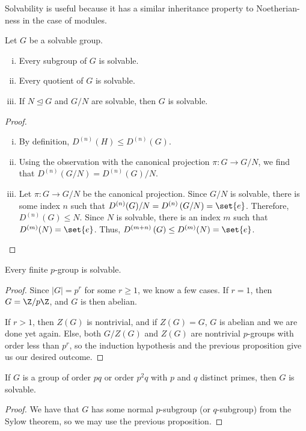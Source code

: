 \documentclass[10pt]{mypackage}
\begin{document}
Solvability is useful because it has a similar inheritance property to Noetherian-ness in the case of modules.
\begin{proposition}
  Let $G$ be a solvable group.
  \begin{enumerate}[(i)]
    \item Every subgroup of $G$ is solvable.
    \item Every quotient of $G$ is solvable.
    \item If $N\trianglelefteq G$ and $G/N$ are solvable, then $G$ is solvable.
  \end{enumerate}
\end{proposition}
\begin{proof}\hfill
  \begin{enumerate}[(i)]
    \item By definition, $D^{(n)}(H)\leq D^{(n)}(G)$.
    \item Using the observation with the canonical projection $\pi\colon G\rightarrow G/N$, we find that $D^{(n)}(G/N) = D^{(n)}(G)/N$.
    \item Let $\pi\colon G\rightarrow G/N$ be the canonical projection. Since $G/N$ is solvable, there is some index $n$ such that $D^{(n)}(G)/N = D^{(n)}\left( G/N \right) = \set{e}$. Therefore, $D^{(n)}(G)\leq N$. Since $N$ is solvable, there is an index $m$ such that $D^{(m)}(N) = \set{e}$. Thus, $D^{(m+n)}\left( G \right) \leq D^{(m)}(N) = \set{e}$.
  \end{enumerate}
\end{proof}
\begin{corollary}
  Every finite $p$-group is solvable.
\end{corollary}
\begin{proof}
  Since $\left\vert G \right\vert = p^{r}$ for some $r \geq 1$, we know a few cases. If $r = 1$, then $G = \Z/p\Z$, and $G$ is then abelian.%

  If $r > 1$, then $Z(G)$ is nontrivial, and if $Z(G) = G$, $G$ is abelian and we are done yet again. Else, both $G/Z(G)$ and $Z(G)$ are nontrivial $p$-groups with order less than $p^{r}$, so the induction hypothesis and the previous proposition give us our desired outcome.
\end{proof}
\begin{corollary}
  If $G$ is a group of order $pq$ or order $p^2q$ with $p$ and $q$ distinct primes, then $G$ is solvable.
\end{corollary}
\begin{proof}
  We have that $G$ has some normal $p$-subgroup (or $q$-subgroup) from the Sylow theorem, so we may use the previous proposition.
\end{proof}
\end{document}
